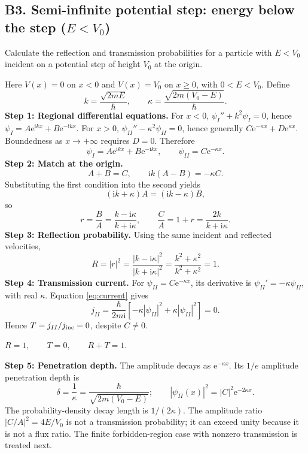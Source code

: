 \documentclass[11pt,a4paper]{article}
\newcommand{\key}[1]{\begin{resultbox}\centering\(\displaystyle #1\)\end{resultbox}}
\newcommand{\iu}{\mathrm{i}}
\newcommand{\ee}{\mathrm{e}}
\newcommand{\abs}[1]{\left|#1\right|}
\begin{document}
\subsection{B3. Semi-infinite potential step: energy below the step ($E<V_0$)}
\begin{questionbox}
Calculate the reflection and transmission probabilities for a particle with $E<V_0$ incident on a potential step of height $V_0$ at the origin.
\end{questionbox}
Here $V(x)=0$ on $x<0$ and $V(x)=V_0$ on $x\geq0$, with $0<E<V_0$. Define
\begin{equation}
k=\frac{\sqrt{2mE}}{\hbar},\qquad\kappa=\frac{\sqrt{2m(V_0-E)}}{\hbar}.
\end{equation}
\textbf{Step 1: Regional differential equations.} For $x<0$, $\psi_I''+k^2\psi_I=0$, hence $\psi_I=A\ee^{\iu kx}+B\ee^{-\iu kx}$. For $x>0$, $\psi_{II}''-\kappa^2\psi_{II}=0$, hence generally $C\ee^{-\kappa x}+D\ee^{\kappa x}$. Boundedness as $x\to+\infty$ requires $D=0$. Therefore
\begin{equation}
\boxed{\psi_I=A\ee^{\iu kx}+B\ee^{-\iu kx},\qquad\psi_{II}=C\ee^{-\kappa x}.}
\end{equation}
\textbf{Step 2: Match at the origin.}
\begin{equation}
A+B=C,\qquad \iu k(A-B)=-\kappa C.
\end{equation}
Substituting the first condition into the second yields
\begin{equation}
(\iu k+\kappa)A=(\iu k-\kappa)B,
\end{equation}
so
\begin{equation}
\boxed{r=\frac BA=\frac{k-\iu\kappa}{k+\iu\kappa},\qquad \frac CA=1+r=\frac{2k}{k+\iu\kappa}.}
\end{equation}
\textbf{Step 3: Reflection probability.} Using the same incident and reflected velocities,
\begin{equation}
R=\abs r^2=\frac{\abs{k-\iu\kappa}^2}{\abs{k+\iu\kappa}^2}=\frac{k^2+\kappa^2}{k^2+\kappa^2}=\boxed{1}.
\end{equation}
\textbf{Step 4: Transmission current.} For $\psi_{II}=C\ee^{-\kappa x}$, its derivative is $\psi_{II}'=-\kappa\psi_{II}$, with real $\kappa$. Equation \eqref{eq:current} gives
\begin{equation}
j_{II}=\frac{\hbar}{2m\iu}[-\kappa\abs{\psi_{II}}^2+\kappa\abs{\psi_{II}}^2]=0.
\end{equation}
Hence $T=j_{II}/j_{\rm inc}=0$, despite $C\ne0$.
\key{\boxed{R=1,\qquad T=0,\qquad R+T=1.}}
\textbf{Step 5: Penetration depth.} The amplitude decays as $\ee^{-\kappa x}$. Its $1/e$ amplitude penetration depth is
\begin{equation}
\boxed{\delta=\frac1\kappa=\frac\hbar{\sqrt{2m(V_0-E)}}};\qquad
\abs{\psi_{II}(x)}^2=\abs C^2\ee^{-2\kappa x}.
\end{equation}
The probability-density decay length is $1/(2\kappa)$. The amplitude ratio $\abs{C/A}^2=4E/V_0$ is not a transmission probability; it can exceed unity because it is not a flux ratio. The finite forbidden-region case with nonzero transmission is treated next.
\end{document}
